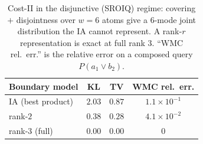\documentclass[letterpaper]{article}
\begin{document}
\begin{table}[t]\centering
\caption{Cost-II in the disjunctive (SROIQ) regime: covering $+$ disjointness over $w{=}6$ atoms give a $6$-mode joint distribution the IA cannot represent. A rank-$r$ representation is exact at full rank $3$. ``WMC rel.\ err.'' is the relative error on a composed query $P(a_1\vee b_2)$.}\label{tab:disj}
\footnotesize
\setlength{\tabcolsep}{3pt}
\begin{tabular}{@{}lccc@{}}
\toprule
Boundary model & KL & TV & WMC rel.\ err.\\
\midrule
IA (best product) & $2.03$ & $0.87$ & $1.1{\times}10^{-1}$\\
rank-$2$ & $0.38$ & $0.28$ & $4.1{\times}10^{-2}$\\
rank-$3$ (full) & $0.00$ & $0.00$ & $0$\\
\bottomrule
\end{tabular}
\end{table}


\end{document}
